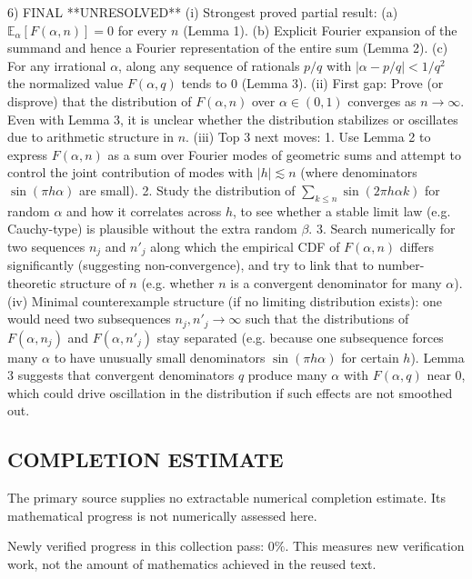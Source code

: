 6) FINAL
**UNRESOLVED**
(i) Strongest proved partial result: (a) $\mathbb{E}_\alpha[F(\alpha,n)]=0$ for every $n$ (Lemma 1). (b) Explicit Fourier expansion of the summand and hence a Fourier representation of the entire sum (Lemma 2). (c) For any irrational $\alpha$, along any sequence of rationals $p/q$ with $|\alpha-p/q|<1/q^2$ the normalized value $F(\alpha,q)$ tends to $0$ (Lemma 3).
(ii) First gap: Prove (or disprove) that the distribution of $F(\alpha,n)$ over $\alpha\in(0,1)$ converges as $n\to\infty$.  Even with Lemma 3, it is unclear whether the distribution stabilizes or oscillates due to arithmetic structure in $n$.
(iii) Top 3 next moves:
  1. Use Lemma 2 to express $F(\alpha,n)$ as a sum over Fourier modes of geometric sums and attempt to control the joint contribution of modes with $|h|\lesssim n$ (where denominators $\sin(\pi h\alpha)$ are small).
  2. Study the distribution of $\sum_{k\le n} \sin(2\pi h\alpha k)$ for random $\alpha$ and how it correlates across $h$, to see whether a stable limit law (e.g. Cauchy-type) is plausible without the extra random $\beta$.
  3. Search numerically for two sequences $n_j$ and $n'_j$ along which the empirical CDF of $F(\alpha,n)$ differs significantly (suggesting non-convergence), and try to link that to number-theoretic structure of $n$ (e.g. whether $n$ is a convergent denominator for many $\alpha$).
(iv) Minimal counterexample structure (if no limiting distribution exists): one would need two subsequences $n_j,n'_j\to\infty$ such that the distributions of $F(\alpha,n_j)$ and $F(\alpha,n'_j)$ stay separated (e.g. because one subsequence forces many $\alpha$ to have unusually small denominators $\sin(\pi h\alpha)$ for certain $h$).  Lemma 3 suggests that convergent denominators $q$ produce many $\alpha$ with $F(\alpha,q)$ near $0$, which could drive oscillation in the distribution if such effects are not smoothed out.


\subsection*{COMPLETION ESTIMATE}
The primary source supplies no extractable numerical completion estimate. Its mathematical progress is not numerically assessed here.

Newly verified progress in this collection pass: $0\%$. This measures new verification work, not the amount of mathematics achieved in the reused text.
